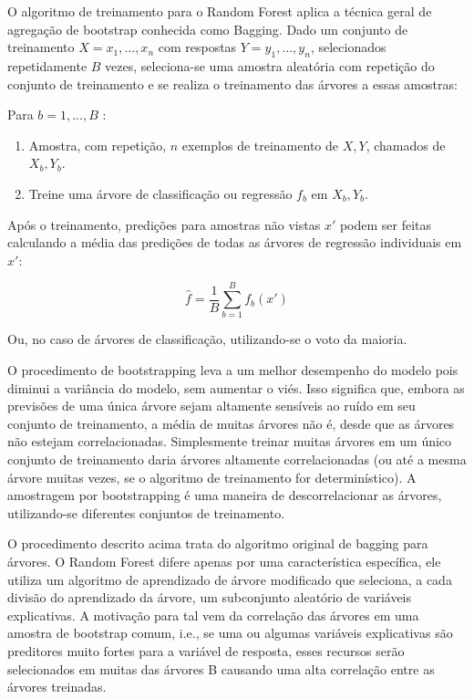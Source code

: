 O algoritmo de treinamento para o Random Forest aplica a técnica geral de agregação de bootstrap conhecida como Bagging. Dado um conjunto de treinamento $ {\displaystyle X = x_{1},\ldots ,x_{n}} $ com respostas $ {\displaystyle Y = y_{1},\ldots ,y_{n}} $, selecionados repetidamente $ B $ vezes, seleciona-se uma amostra aleatória com repetição do conjunto de treinamento e se realiza o treinamento das árvores a essas amostras:

Para $ b = 1, ..., B $ :

\begin{enumerate}
	\item Amostra, com repetição, $ n $ exemplos de treinamento de $ X, Y $, chamados de $ X_b, Y_b $.
	\item Treine uma árvore de classificação ou regressão $ f_b $ em $ X_b, Y_b $.
\end{enumerate}

Após o treinamento, predições para amostras não vistas $ x' $ podem ser feitas calculando a média das predições de todas as árvores de regressão individuais em $ x' $:

\begin{equation}
{\displaystyle {\hat {f}}={\frac {1}{B}}\sum _{b=1}^{B}f_{b}(x')}
\end{equation}

Ou, no caso de árvores de classificação, utilizando-se o voto da maioria.

O procedimento de bootstrapping leva a um melhor desempenho do modelo pois diminui a variância do modelo, sem aumentar o viés. Isso significa que, embora as previsões de uma única árvore sejam altamente sensíveis ao ruído em seu conjunto de treinamento, a média de muitas árvores não é, desde que as árvores não estejam correlacionadas. Simplesmente treinar muitas árvores em um único conjunto de treinamento daria árvores altamente correlacionadas (ou até a mesma árvore muitas vezes, se o algoritmo de treinamento for determinístico). A amostragem por bootstrapping é uma maneira de descorrelacionar as árvores, utilizando-se diferentes conjuntos de treinamento.

O procedimento descrito acima trata do algoritmo original de bagging para árvores. O Random Forest difere apenas por uma característica específica, ele utiliza um algoritmo de aprendizado de árvore modificado que seleciona, a cada divisão do aprendizado da árvore, um subconjunto aleatório de variáveis explicativas. A motivação para tal vem da correlação das árvores em uma amostra de bootstrap comum, i.e., se uma ou algumas variáveis explicativas são preditores muito fortes para a variável de resposta, esses recursos serão selecionados em muitas das árvores B causando uma alta correlação entre as árvores treinadas.

